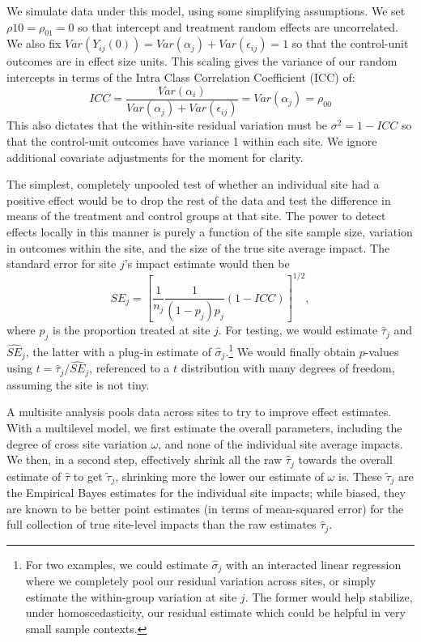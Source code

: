 \documentclass[]{article}
\begin{document}
We simulate data under this model, using some simplifying assumptions.
We set $\rho{10} = \rho_{01} = 0$ so that intercept and treatment random effects are uncorrelated.
We also fix $Var(Y_{ij}(0)) = Var(\alpha_j) + Var(\epsilon_{ij}) = 1$ so that the control-unit outcomes are in effect size units.
This scaling gives the variance of our random intercepts in terms of the Intra Class Correlation Coefficient (ICC) of:
$$ICC = \frac{Var(\alpha_i)}{Var(\alpha_j) + Var(\epsilon_{ij})} = Var(\alpha_j) = \rho_{00}$$
This also dictates that the within-site residual variation must be $\sigma^2 = 1-ICC$ so that the control-unit outcomes have variance 1 within each site.
We ignore additional covariate adjustments for the moment for clarity.

The simplest, completely unpooled test of whether an individual site had a positive effect would be to drop the rest of the data and test the difference in means of the treatment and control groups at that site.
The power to detect effects locally in this manner is purely a function of the site sample size, variation in outcomes within the site, and the size of the true site average impact.
The standard error for site $j$'s impact estimate would then be
$$ SE_j = \left[ \frac{1}{n_j} \frac{1}{(1-p_j)p_j} (1-ICC) \right]^{1/2} , $$ 
where $p_j$ is the proportion treated at site $j$.
For testing, we would estimate $\hat{\tau}_j$ and $\widehat{SE}_j$, the latter with a plug-in estimate of $\hat{\sigma}_j$.\footnote{For two examples, we could estimate $\hat{\sigma}_j$ with an interacted linear regression where we completely pool our residual variation across sites, or simply estimate the within-group variation at site $j$.
The former would help stabilize, under homoscedasticity, our residual estimate which could be helpful in very small sample contexts.}
We would finally obtain $p$-values using $t = \hat{\tau}_j / \widehat{SE}_j$, referenced to a $t$ distribution with many degrees of freedom, assuming the site is not tiny.

A multisite analysis pools data across sites to try to improve effect estimates.
With a multilevel model, we first estimate the overall parameters, including the degree of cross site variation $\omega$, and none of the individual site average impacts.
We then, in a second step, effectively shrink all the raw $\hat{\tau}_j$ towards the overall estimate of $\hat{\tau}$ to get $\tilde{\tau}_j$, shrinking more the lower our estimate of $\omega$ is.
These $\tilde{\tau}_j$ are the Empirical Bayes estimates for the individual site impacts; while biased, they are known to be better point estimates (in terms of mean-squared error) for the full collection of true site-level impacts than the raw estimates $\hat{\tau}_j$.
\end{document}
